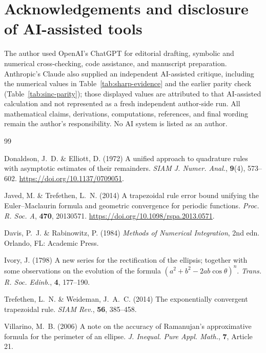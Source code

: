 \documentclass[11pt]{article}
\theoremstyle{definition}
\numberwithin{equation}{section}
\begin{document}
\section*{Acknowledgements and disclosure of AI-assisted tools}

The author used OpenAI's ChatGPT for editorial drafting, symbolic
and numerical cross-checking, code assistance, and manuscript preparation.
Anthropic's Claude also supplied an independent AI-assisted critique,
including the numerical values in Table~\ref{tab:sharp-evidence} and
the earlier parity check (Table~\ref{tab:sinc-parity}); those displayed
values are attributed to that AI-assisted calculation and not represented
as a fresh independent author-side run.  All mathematical claims,
derivations, computations, references, and final wording remain the
author's responsibility.  No AI system is listed as an author.

\begin{thebibliography}{99}

Donaldson, J.~D. \& Elliott, D. (1972)
A unified approach to quadrature rules with asymptotic estimates of their remainders.
\emph{SIAM J. Numer. Anal.}, \textbf{9}(4), 573--602.
\url{https://doi.org/10.1137/0709051}.

Javed, M. \& Trefethen, L.~N. (2014)
A trapezoidal rule error bound unifying the Euler--Maclaurin formula
and geometric convergence for periodic functions.
\emph{Proc. R. Soc. A}, \textbf{470}, 20130571.
\url{https://doi.org/10.1098/rspa.2013.0571}.

Davis, P.~J. \& Rabinowitz, P. (1984)
\emph{Methods of Numerical Integration}, 2nd edn.
Orlando, FL: Academic Press.

Ivory, J. (1798)
A new series for the rectification of the ellipsis; together with some
observations on the evolution of the formula
\((a^2+b^2-2ab\cos\theta)^n\).
\emph{Trans. R. Soc. Edinb.}, \textbf{4}, 177--190.

Trefethen, L.~N. \& Weideman, J.~A.~C. (2014)
The exponentially convergent trapezoidal rule.
\emph{SIAM Rev.}, \textbf{56}, 385--458.

Villarino, M.~B. (2006)
A note on the accuracy of Ramanujan's approximative formula for the
perimeter of an ellipse.
\emph{J. Inequal. Pure Appl. Math.}, \textbf{7}, Article 21.

\end{thebibliography}
\end{document}
